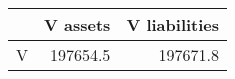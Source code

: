 \begin{tabular}{lrr}
\toprule
{} &  V assets &  V liabilities \\
\midrule
V &  197654.5 &       197671.8 \\
\bottomrule
\end{tabular}
